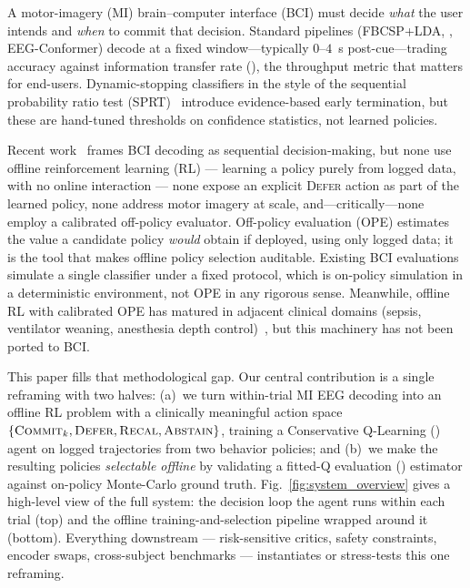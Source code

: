 
A motor-imagery (MI) brain--computer interface (BCI) must decide
\emph{what} the user intends and \emph{when} to commit that decision.
Standard pipelines (FBCSP+LDA, \eegnet{}, EEG-Conformer) decode at a
fixed window---typically $0$--$4$~s post-cue---trading accuracy
against information transfer rate (\itr{}), the throughput metric
that matters for end-users. Dynamic-stopping classifiers in the
style of the sequential probability ratio test
(SPRT)~\cite{Liu2017MotorImageryBTSPRT} introduce
evidence-based early termination, but these are hand-tuned
thresholds on confidence
statistics, not learned policies.

Recent
work~\cite{Aung2024EEG_RL_Net,Fidencio2025ErrPRL}
frames BCI decoding as sequential decision-making, but none use
offline reinforcement learning (RL) --- learning a policy purely
from logged data, with no online interaction --- none expose an
explicit \textsc{Defer} action as part of the learned policy, none
address motor imagery at scale, and---critically---none employ a
calibrated off-policy evaluator. Off-policy evaluation (OPE)
estimates the value a candidate policy \emph{would} obtain if
deployed, using only logged data; it is the tool that makes
offline policy selection auditable. Existing BCI evaluations
simulate a single classifier under a fixed protocol, which is
on-policy simulation in a deterministic environment, not OPE in
any rigorous sense.
Meanwhile, offline RL with calibrated OPE has matured in adjacent
clinical domains (sepsis, ventilator weaning, anesthesia depth
control)~\cite{Kumar2020CQL,Le2019BatchRL},
but this machinery has not been ported to BCI.

This paper fills that methodological gap. Our central
contribution is a single reframing with two halves: (a)~we turn
within-trial MI EEG decoding into an offline RL problem with a
clinically meaningful action space $\{\textsc{Commit}_k,
\textsc{Defer}, \textsc{Recal}, \textsc{Abstain}\}$, training a
Conservative Q-Learning (\cql{})~\cite{Kumar2020CQL} agent on
logged trajectories from two behavior policies; and (b)~we make
the resulting policies \emph{selectable offline} by validating a
fitted-Q evaluation (\fqe{}) estimator against on-policy
Monte-Carlo ground truth. Fig.~\ref{fig:system_overview} gives a
high-level view of the full system: the decision loop the agent
runs within each trial (top) and the offline training-and-selection
pipeline wrapped around it (bottom). Everything downstream ---
risk-sensitive critics, safety constraints, encoder swaps,
cross-subject benchmarks --- instantiates or stress-tests this
one reframing.

